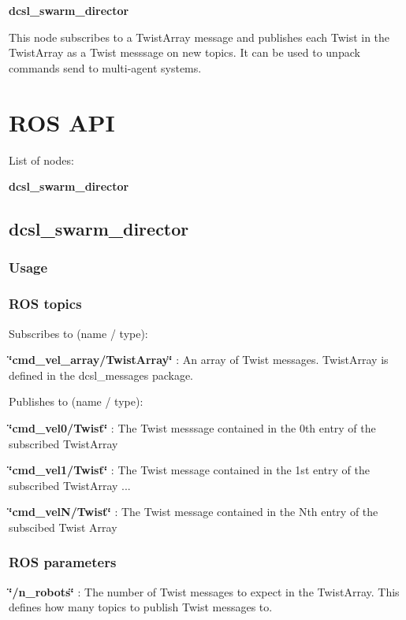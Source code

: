 

{\bfseries dcsl\-\_\-swarm\-\_\-director} 

\-This node subscribes to a \-Twist\-Array message and publishes each \-Twist in the \-Twist\-Array as a \-Twist messsage on new topics. \-It can be used to unpack commands send to multi-\/agent systems.\section{\-R\-O\-S A\-P\-I}\label{index_rosapi}
\-List of nodes\-:
\begin{DoxyItemize}
\item {\bfseries dcsl\-\_\-swarm\-\_\-director} 
\end{DoxyItemize}



\subsection{dcsl\-\_\-swarm\-\_\-director}\label{index_dcsl_swarm_director}
\subsubsection{\-Usage}\label{index_usage}
\subsubsection{\-R\-O\-S topics}\label{index_topics}
\-Subscribes to (name / type)\-:
\begin{DoxyItemize}
\item {\bfseries \char`\"{}cmd\-\_\-vel\-\_\-array/\-Twist\-Array\char`\"{}} \-: \-An array of \-Twist messages. \-Twist\-Array is defined in the dcsl\-\_\-messages package.
\end{DoxyItemize}

\-Publishes to (name / type)\-:
\begin{DoxyItemize}
\item {\bfseries \char`\"{}cmd\-\_\-vel0/\-Twist\char`\"{}} \-: \-The \-Twist messsage contained in the 0th entry of the subscribed \-Twist\-Array
\item {\bfseries \char`\"{}cmd\-\_\-vel1/\-Twist\char`\"{}} \-: \-The \-Twist message contained in the 1st entry of the subscribed \-Twist\-Array ...
\item {\bfseries \char`\"{}cmd\-\_\-vel\-N/\-Twist\char`\"{}} \-: \-The \-Twist message contained in the \-Nth entry of the subscibed \-Twist \-Array
\end{DoxyItemize}\subsubsection{\-R\-O\-S parameters}\label{index_parameters}

\begin{DoxyItemize}
\item {\bfseries \char`\"{}/n\-\_\-robots\char`\"{}} \-: \-The number of \-Twist messages to expect in the \-Twist\-Array. \-This defines how many topics to publish \-Twist messages to.
\end{DoxyItemize}



 